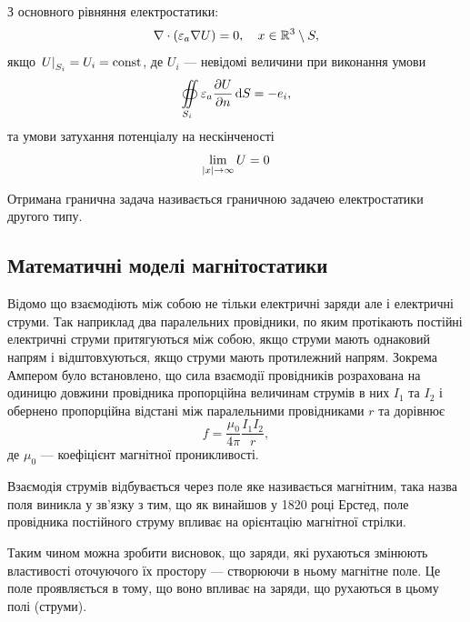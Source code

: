 \begin{solution}
	З основного рівняння електростатики:
	\begin{equation}
		\nabla \cdot (\varepsilon_a \nabla U) = 0, \quad x \in \mathbb{R}^3 \setminus S,
	\end{equation}
	якщо $\left. U \right|_{S_i} = U_i = \operatorname{const}$, де $U_i$ --- невідомі величини при виконання умови 
	\begin{equation}
		\displaystyle\oiint\limits_{S_i} \varepsilon_a \frac{\partial U}{\partial n} \mathop{}\!\mathrm{d} S = -e_i,
	\end{equation}
	та умови затухання потенціалу на нескінченості
	\begin{equation}
		\displaystyle\lim\limits_{|x| \to \infty} U = 0
	\end{equation}
\end{solution}

\begin{definition}
	Отримана гранична задача називається граничною задачею електростатики другого типу.
\end{definition}

\subsection{Математичні моделі магнітостатики}

Відомо що взаємодіють між собою не тільки електричні заряди але і електричні струми. Так наприклад два паралельних провідники, по яким протікають постійні електричні струми притягуються між собою, якщо струми мають однаковий напрям і відштовхуються, якщо струми мають протилежний напрям. Зокрема Ампером було встановлено, що сила взаємодії провідників розрахована на одиницю довжини провідника пропорційна величинам струмів в них $I_1$ та $I_2$ і обернено пропорційна відстані між паралельними провідниками $r$ та дорівнює
\begin{equation}
	f = \frac{\mu_0}{4 \pi} \frac{I_1 I_2}{r},
\end{equation}
де $\mu_0$ --- коефіцієнт магнітної проникливості. \medskip

Взаємодія струмів відбувається через поле яке називається магнітним, така назва поля виникла у зв'язку з тим, що як винайшов у 1820 році Ерстед, поле провідника постійного струму впливає на орієнтацію магнітної стрілки. \medskip

Таким чином можна зробити висновок, що заряди, які рухаються змінюють властивості оточуючого їх простору --- створюючи в ньому магнітне поле. Це поле проявляється в тому, що воно впливає на заряди, що рухаються в цьому полі (струми). \medskip

